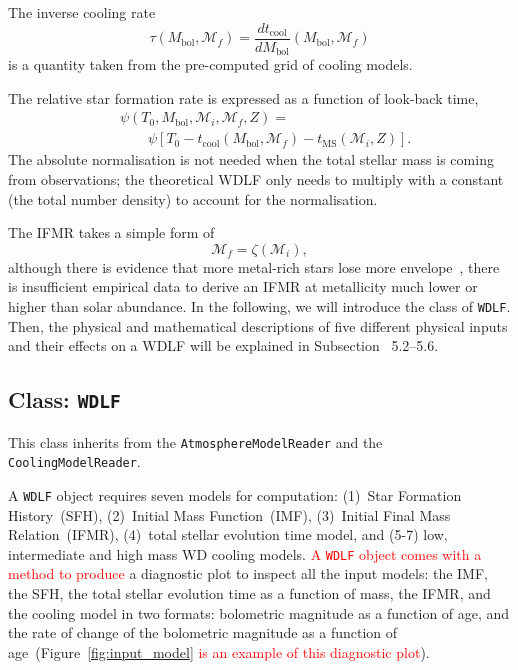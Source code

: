 \documentclass[fleqn,usenatbib]{rasti}
\begin{document}
The inverse cooling rate
\begin{equation}
    \tau(M_\mathrm{bol}, \mathcal{M}_f) = \dfrac{dt_{\mathrm{cool}}}{dM_\mathrm{bol}} \left( M_\mathrm{bol}, \mathcal{M}_f \right)
\end{equation}
is a quantity taken from the pre-computed grid of cooling models. 

The relative star formation rate is expressed as a function of look-back time,
\begin{align}
    &\psi(T_0, M_\mathrm{bol}, \mathcal{M}_i, \mathcal{M}_f, Z) =\\
    &\qquad\psi\left[T_0 - t_{\mathrm{cool}}\left(M_\mathrm{bol}, \mathcal{M}_f\right) - t_{\mathrm{MS}}\left(\mathcal{M}_i, Z\right)\right].
\end{align}
The absolute normalisation is not needed when the total stellar mass is coming
from observations; the theoretical WDLF only needs to multiply with a
constant (the total number density) to account for the normalisation.

The IFMR takes a simple form of
\begin{equation}
    \mathcal{M}_f = \zeta(\mathcal{M}_i),
\end{equation}
although there is evidence that more metal-rich stars lose more
envelope~\citep{2007ApJ...671..761K}, there is insufficient empirical data to
derive an IFMR at metallicity much lower or higher than solar abundance.
In the following, we will introduce the class of \texttt{WDLF}. Then, the
physical and mathematical descriptions of five different physical inputs and
their effects on a WDLF will be explained in Subsection \textsection~5.2--5.6.



\subsection{Class: \texttt{WDLF}}
\label{sec:wdlf}
This class inherits from the \verb+AtmosphereModelReader+ and the
\verb+CoolingModelReader+.

A \texttt{WDLF} object requires seven models for computation: (1)~Star
Formation History~(SFH), (2)~Initial Mass Function~(IMF), (3)~Initial Final
Mass Relation~(IFMR), (4)~total stellar evolution time model, and (5-7) low,
intermediate and high mass WD cooling models.
\textcolor{red}{A \texttt{WDLF} object comes with a method to produce}
a diagnostic plot to inspect all the input models: the IMF, the SFH, the total
stellar evolution time as a function of mass, the IFMR, and the cooling model
in two formats: bolometric magnitude as a function of age, and the rate of
change of the bolometric magnitude as a function of
age~(Figure~\ref{fig:input_model} \textcolor{red}{is an example of this diagnostic plot}).
\end{document}
